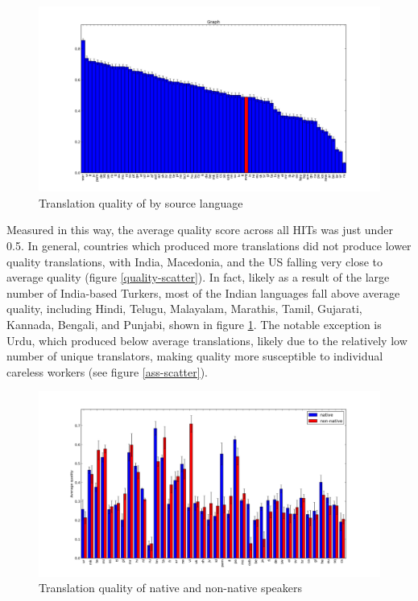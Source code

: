 \documentclass[11pt]{article}
\begin{document}
\begin{figure}[h]
\centering
\includegraphics[width=6in]{figures/quality-hitlang-new}
\caption{Translation quality of by source language}
\label{hitlangqual-bar}
\end{figure}

Measured in this way, the average quality score across all HITs was just under 0.5. In general, countries which produced more translations did not produce lower quality translations, with India, Macedonia, and the US falling very close to average quality (figure \ref{quality-scatter}). In fact, likely as a result of the large number of India-based Turkers, most of the Indian languages fall above average quality, including Hindi, Telugu, Malayalam, Marathis, Tamil, Gujarati, Kannada, Bengali, and Punjabi, shown in figure \ref{hitlangqual-bar}. The notable exception is Urdu, which produced below average translations, likely due to the relatively low number of unique translators, making quality more susceptible to individual careless workers (see figure \ref{ass-scatter}). 


\begin{figure}[h]
\centering
\includegraphics[width=6in]{figures/quality-natlang-sorted}
\caption{Translation quality of native and non-native speakers}
\label{natlangqual-bar}
\end{figure}
\end{document}
